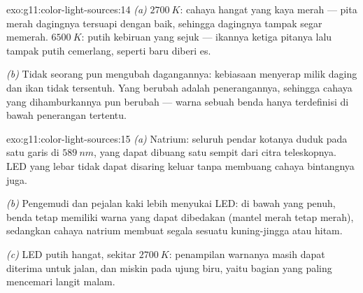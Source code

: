 \begin{solution}{exo:g11:color-light-sources:14}
\emph{(a)} $\qty{2700}{K}$: cahaya hangat yang kaya merah --- pita
merah dagingnya tersuapi dengan baik, sehingga dagingnya tampak segar
memerah. $\qty{6500}{K}$: putih kebiruan yang sejuk --- ikannya
 ketiga pitanya lalu tampak putih cemerlang, seperti baru
diberi es.

\emph{(b)} Tidak seorang pun mengubah dagangannya: kebiasaan menyerap
milik daging dan ikan tidak tersentuh. Yang berubah adalah
penerangannya, sehingga cahaya yang dihamburkannya pun berubah ---
warna sebuah benda hanya terdefinisi di bawah penerangan tertentu.
\end{solution}

\begin{solution}{exo:g11:color-light-sources:15}
\emph{(a)} Natrium: seluruh pendar kotanya duduk pada satu garis di
$\qty{589}{nm}$, yang dapat dibuang satu  sempit dari citra
teleskopnya.  LED yang lebar tidak dapat disaring keluar tanpa
membuang cahaya bintangnya juga.

\emph{(b)} Pengemudi dan pejalan kaki lebih menyukai LED: di bawah
 yang penuh, benda tetap memiliki warna yang dapat dibedakan
(mantel merah tetap merah), sedangkan cahaya natrium membuat segala
sesuatu kuning-jingga atau hitam.

\emph{(c)} LED putih hangat, sekitar $\qty{2700}{K}$: penampilan
warnanya masih dapat diterima untuk jalan, dan  miskin pada
ujung biru, yaitu bagian yang paling mencemari langit malam.
\end{solution}

